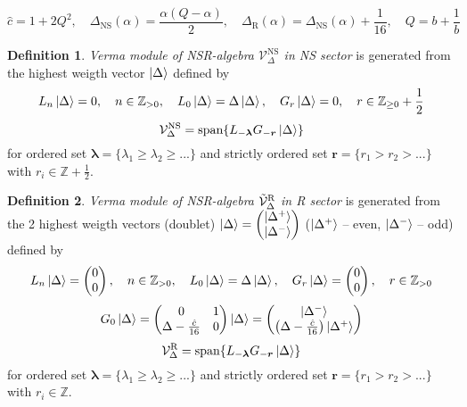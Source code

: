 \documentclass[12pt]{article}
\theoremstyle{definition}
\newtheorem{defin}{Definition}[]
\begin{document}
\begin{equation}
    \hat{c}=1+2Q^2,\quad\Delta_{\text{NS}}(\alpha)=\frac{\alpha(Q-\alpha)}{2},\quad\Delta_{\text{R}}(\alpha)=\Delta_{\text{NS}}(\alpha)+\frac{1}{16},\quad Q=b+\frac{1}{b}
\end{equation}
\begin{defin}
    \textit{Verma module of NSR-algebra $\mathcal{V}^{\text{NS}}_\Delta$ in NS sector} is generated from the highest weigth vector $\ket{\Delta}$ defined by
    \begin{equation}
        L_n\ket{\Delta}=0,\quad n\in\mathbb{Z}_{>0},\quad L_0\ket{\Delta}=\Delta\ket{\Delta},\quad G_r\ket{\Delta}=0,\quad r\in\mathbb{Z}_{\geq0}+\frac{1}{2}
    \end{equation}
    \begin{equation}
        \mathcal{V}^{\text{NS}}_\Delta=\text{span}\{L_{-\bm{\lambda}}G_{-\bm{r}}\ket{\Delta}\}
    \end{equation}
    for ordered set $\bm{\lambda} =\{\lambda_1\geq \lambda_2 \geq ...\}$ and strictly ordered set $\bm{r} = \{r_1 > r_2 > ...\}$ with $r_i\in\mathbb{Z} +\frac{1}{2}$.
\end{defin}
\begin{defin}
\textit{Verma module of NSR-algebra $\Tilde{\mathcal{V}}^{\text{R}}_\Delta$ in R sector} is generated from the 2 highest weigth vectors (doublet) $\ket{\Delta}=\begin{pmatrix}
    \ket{\Delta^+}\\
    \ket{\Delta^-}
    \end{pmatrix}$ ($\ket{\Delta^+}$ -- even, $\ket{\Delta^-}$ -- odd) defined by
    \begin{equation}
        L_n\ket{\Delta}=\begin{pmatrix}
            0\\
            0
        \end{pmatrix},\quad n\in\mathbb{Z}_{>0},\quad L_0\ket{\Delta}=\Delta\ket{\Delta},\quad G_r\ket{\Delta}=\begin{pmatrix}
            0\\
            0
        \end{pmatrix},\quad r\in\mathbb{Z}_{>0}
    \end{equation}
    \begin{equation}
        G_0\ket{\Delta}=\begin{pmatrix}
            0 &1\\
        \Delta-\frac{\hat{c}}{16} & 0
        \end{pmatrix}\ket{\Delta}=\begin{pmatrix}
    \ket{\Delta^-}\\
    \left(\Delta-\frac{\hat{c}}{16}\right)\ket{\Delta^+}
    \end{pmatrix}
    \end{equation}
    \begin{equation}
        \mathcal{V}^{\text{R}}_\Delta=\text{span}\{L_{-\bm{\lambda}}G_{-\bm{r}}\ket{\Delta}\}
    \end{equation}
    for ordered set $\bm{\lambda} =\{\lambda_1\geq \lambda_2 \geq ...\}$ and strictly ordered set $\bm{r} = \{r_1 > r_2 > ...\}$ with $r_i\in\mathbb{Z}$.
\end{defin}
\end{document}
